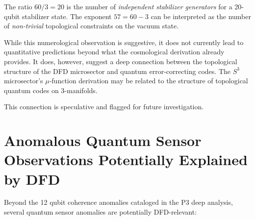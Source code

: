 \documentclass[11pt]{article}
\theoremstyle{definition}
\theoremstyle{remark}
\begin{document}
The ratio $60/3 = 20$ is the number of \emph{independent stabilizer
generators} for a 20-qubit stabilizer state. The exponent $57 = 60 - 3$
can be interpreted as the number of \emph{non-trivial} topological
constraints on the vacuum state.

While this numerological observation is suggestive, it does not
currently lead to quantitative predictions beyond what the cosmological
derivation already provides. It does, however, suggest a deep connection
between the topological structure of the DFD microsector and quantum
error-correcting codes. The $S^3$ microsector's $\mu$-function derivation
may be related to the structure of topological quantum codes on 3-manifolds.

This connection is speculative and flagged for future investigation.

\section{Anomalous Quantum Sensor Observations Potentially Explained by DFD}
\label{sec:anomalies}

Beyond the 12 qubit coherence anomalies cataloged in the P3 deep
analysis, several quantum sensor anomalies are potentially DFD-relevant:
\end{document}
